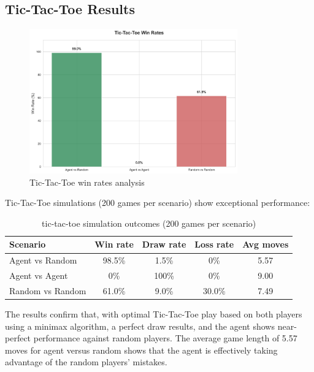 \documentclass[12pt]{article}
\begin{document}
\subsection{Tic-Tac-Toe Results}

\begin{figure}[H]
\centering
\includegraphics[width=0.8\textwidth]{output/images/tic_tac_toe_win_rates.png}
\caption{Tic-Tac-Toe win rates analysis}
\label{fig:tic_tac_toe_win_rates}
\end{figure}

Tic-Tac-Toe simulations (200 games per scenario) show exceptional performance:
\begin{table}[H]
    \centering
    \begin{tabular}{lcccc}
        \toprule
        \textbf{Scenario} & \textbf{Win rate} & \textbf{Draw rate} & \textbf{Loss rate} & \textbf{Avg moves} \\
        \midrule
        Agent vs Random & 98.5\% & 1.5\% & 0\% & 5.57 \\
        Agent vs Agent & 0\% & 100\% & 0\% & 9.00 \\
        Random vs Random & 61.0\% & 9.0\% & 30.0\% & 7.49 \\
        \bottomrule
    \end{tabular}
    \caption{tic-tac-toe simulation outcomes (200 games per scenario)}
    \label{tab:tic_tac_toe_outcomes}
\end{table}

The results confirm that, with optimal Tic-Tac-Toe play based on both players using a minimax algorithm, a perfect draw results, and the agent shows near-perfect performance against random players. The average game length of 5.57 moves for agent versus random shows that the agent is effectively taking advantage of the random players' mistakes.
\end{document}
